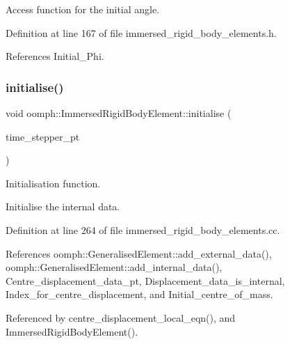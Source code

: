 Access function for the initial angle. 



Definition at line 167 of file immersed\+\_\+rigid\+\_\+body\+\_\+elements.\+h.



References Initial\+\_\+\+Phi.

\mbox{\label{classoomph_1_1ImmersedRigidBodyElement_a34eec4f661aafa32f5d4cf14ceb1f850}} 
\subsubsection{\texorpdfstring{initialise()}{initialise()}}
{\footnotesize\ttfamily void oomph\+::\+Immersed\+Rigid\+Body\+Element\+::initialise (\begin{DoxyParamCaption}\item[{\hyperlink{classoomph_1_1TimeStepper}{Time\+Stepper} $\ast$const \&}]{time\+\_\+stepper\+\_\+pt }\end{DoxyParamCaption})\hspace{0.3cm}{\ttfamily [private]}}



Initialisation function. 

Initialise the internal data. 

Definition at line 264 of file immersed\+\_\+rigid\+\_\+body\+\_\+elements.\+cc.



References oomph\+::\+Generalised\+Element\+::add\+\_\+external\+\_\+data(), oomph\+::\+Generalised\+Element\+::add\+\_\+internal\+\_\+data(), Centre\+\_\+displacement\+\_\+data\+\_\+pt, Displacement\+\_\+data\+\_\+is\+\_\+internal, Index\+\_\+for\+\_\+centre\+\_\+displacement, and Initial\+\_\+centre\+\_\+of\+\_\+mass.



Referenced by centre\+\_\+displacement\+\_\+local\+\_\+eqn(), and Immersed\+Rigid\+Body\+Element().

\mbox{\label{classoomph_1_1ImmersedRigidBodyElement_a0ff9948b9df503ec15a32d3f6f19784e}} 
